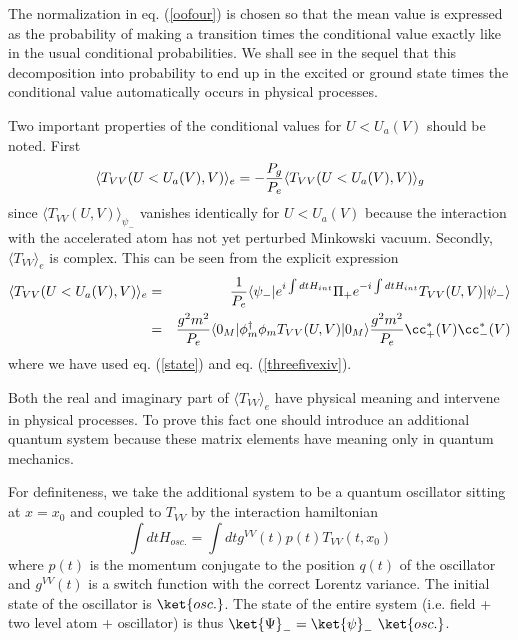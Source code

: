 \documentclass[12pt]{article}
\begin{document}
The normalization in eq. (\ref{oofour}) is chosen so
that the mean value is expressed as the probability of
making a transition times the conditional value exactly like in the usual
conditional probabilities.
We shall see in the sequel that
this decomposition into probability to end up in the excited or ground state
 times the conditional value  automatically occurs in physical
processes.

Two
important properties of the conditional values for $U<U_a(V)$ should be
noted. First
\begin{equation}
 \langle
T_{VV}(U<U_a(V),V)\rangle_e = - { P_g \over P_e} \langle
T_{VV}(U<U_a(V),V)\rangle_g
\label{-}
\end{equation}
since $\langle  T_{VV}(U,V)\rangle_{\psi_-}$
vanishes identically
for $U<U_a(V)$ because
the interaction with the accelerated atom
has not yet perturbed Minkowski vacuum.
Secondly,  $\langle  T_{VV}\rangle_e$ is complex.
This
can be seen from the explicit expression
\begin{eqnarray}
\langle  T_{VV}(U<U_a(V),V)\rangle_e &=& {1 \over P_e}
\langle \psi_-\vert e^{i\int dt H_{int}} \Pi_+  e^{-i\int
dt H_{int}} T_{VV}(U,V)\vert\psi_-\rangle\nonumber\\ &=&
{g^2 m^2 \over P_e} \langle 0_M\vert \phi_m^\dagger \phi_m
T_{VV}(U,V)\vert 0_M\rangle
{g^2 m^2 \over P_e} \cc_+^*(V) \cc_-^*(V)
\label{oofive} \end{eqnarray}
where we have used eq. (\ref{state}) and eq. (\ref{threefivexiv}).

Both the real and imaginary part of $\langle  T_{VV}\rangle_e$ have
physical meaning and intervene in physical processes. To
prove this fact one should introduce an additional quantum
system  because these matrix elements have meaning only
in quantum mechanics.

For definiteness, we take the additional system
to be a quantum oscillator sitting at $x=x_0$ and coupled to
$T_{VV}$ by the interaction hamiltonian
\begin{equation}
\int dt H_{osc.} = \int dt g^{VV}(t) p(t) T_{VV}(t,x_0)
\label{ooten}
\end{equation}
where $p(t)$ is the momentum conjugate to the position $q(t)$ of
the oscillator and $g^{VV}(t)$ is a switch function with
the correct Lorentz variance.
The initial state of the
oscillator is $\ket{osc.}$.
The state of the entire system (i.e. field + two level atom + oscillator) is
thus $\ket{\Psi}_-=\ket{\psi}_-\ \ket{osc.}$.
\end{document}
